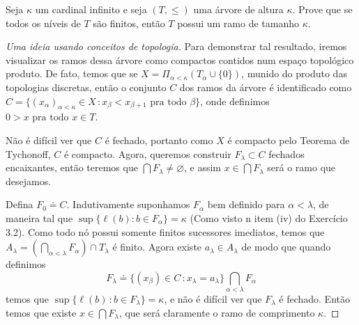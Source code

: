 \documentclass[a4paper]{article}
\begin{document}
  \begin{exercicio}
  Seja \(\kappa\) um cardinal infinito e seja \((T,\leq)\) uma árvore de altura
  $\kappa$. Prove que se todos os níveis de \(T\) são finitos, então \(T\)
  possui um ramo de tamanho $\kappa$.
\end{exercicio}

\begin{proof}[Uma ideia usando conceitos de topologia]
  
  Para demonstrar tal resultado, iremos visualizar os ramos dessa árvore como
  compactos contidos num espaço topológico produto.
  De fato, temos que se \(X=\Pi_{\alpha<\kappa}(T_\alpha\cup\{0\})\), munido do
  produto  das topologias discretas, então o conjunto \(C\) dos ramos da árvore
  é identificado como
  \(C=\{(x_\alpha)_{\alpha<\kappa}\in X \,\colon x_\beta<x_{\beta+1}\text{ pra
    todo }\beta\}\), onde definimos \(0>x\text{ pra todo }x\in T\).
  
  Não é difícil ver que \(C\) é fechado, portanto como \(X\) é compacto pelo
  Teorema de Tychonoff, \(C\) é compacto. Agora, queremos construir
  \(F_\lambda\subset C\) fechados encaixantes, então teremos que
  \(\bigcap F_\lambda\neq\varnothing\), e assim \(x\in\bigcap F_\lambda\) será o
  ramo que desejamos.
  
  Defina \(F_0\doteq C\). Indutivamente suponhamos \(F_\alpha\) bem definido
  para \(\alpha<\lambda\), de maneira tal que \(\sup\{\ell(b):b\in
  F_\alpha\}=\kappa\) (Como visto n item (iv) do  Exercício 3.2).
  Como todo nó possui somente finitos sucessores imediatos, temos que
  \(A_\lambda=(\bigcap_{\alpha<\lambda} F_\alpha)\cap T_\lambda\) é finito.
  Agora existe \(a_\lambda\in A_\lambda\) de modo que quando definimos
  \[F_\lambda\doteq\{(x_\beta)\in C\,\colon
    x_\lambda=a_\lambda\}\bigcap_{\alpha<\lambda} F_\alpha\] temos que
  \(\sup\{\ell(b)\,\colon b\in F_\lambda\}=\kappa\), e não é difícil ver que 
  \(F_\lambda\) é fechado. Então temos que existe \(x\in\bigcap F_\lambda\), que
  será claramente o ramo de comprimento \(\kappa\).
  
  
  \end{proof}
\end{document}
